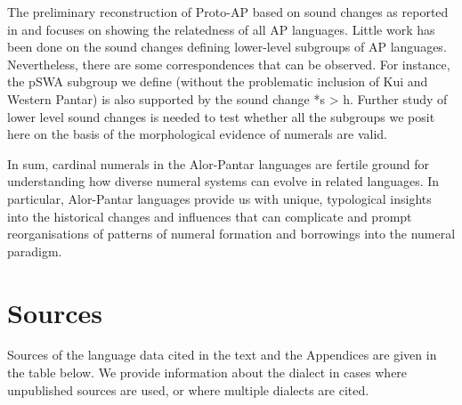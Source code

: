 The preliminary reconstruction of Proto-AP based on sound changes as reported in \citet{HoltonEtAl2012} and \citep{HoltonRobinsonTVhistory}focuses on showing the relatedness of all AP languages. Little work has been done on the sound changes defining lower-level subgroups of AP languages. Nevertheless, there are some correspondences that can be observed. For instance, the pSWA subgroup we define (without the problematic inclusion of Kui and Western Pantar) is also supported by the sound change *s {\textgreater} h. Further study of lower level sound changes is needed to test whether all the subgroups we posit here on the basis of the morphological evidence of numerals are valid. 

In sum, cardinal numerals in the Alor-Pantar languages are fertile ground for understanding how diverse numeral systems can evolve in related languages. In particular, Alor-Pantar languages provide us with unique, typological insights into the historical changes and influences that can complicate and prompt reorganisations of patterns of numeral formation and borrowings into the numeral paradigm.

\newpage
\section{Sources} \label{sec:6:9}
Sources of the language data cited in the text and the Appendices are given in the table below. We provide information about the dialect in cases where unpublished sources are used, or where multiple dialects are cited. \vspace{.2cm}



